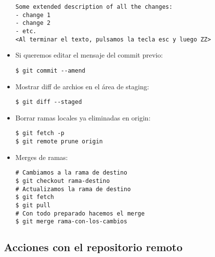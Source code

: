 \begin{itemize}[label=-]
\begin{lstlisting}
Some extended description of all the changes:
- change 1
- change 2
- etc.
<Al terminar el texto, pulsamos la tecla esc y luego ZZ>
\end{lstlisting}

\item Si queremos editar el mensaje del commit previo:
\begin{lstlisting}
$ git commit --amend
\end{lstlisting}

\item Mostrar diff de archios en el área de staging:
\begin{lstlisting}
$ git diff --staged
\end{lstlisting}

\item Borrar ramas locales ya eliminadas en origin:
\begin{lstlisting}
$ git fetch -p
$ git remote prune origin
\end{lstlisting}

\item Merges de ramas:
\begin{lstlisting}
# Cambiamos a la rama de destino
$ git checkout rama-destino
# Actualizamos la rama de destino
$ git fetch
$ git pull
# Con todo preparado hacemos el merge
$ git merge rama-con-los-cambios
\end{lstlisting}

\end{itemize}


\subsection{Acciones con el repositorio remoto}

